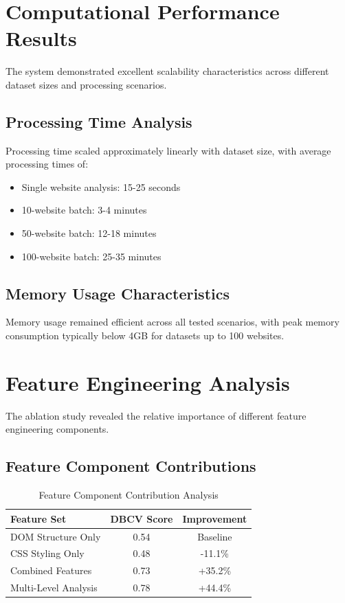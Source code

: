 \section{Computational Performance Results}
\label{sec:performance-results}

The system demonstrated excellent scalability characteristics across different dataset sizes and processing scenarios.

\subsection{Processing Time Analysis}
\label{subsec:processing-time-results}

Processing time scaled approximately linearly with dataset size, with average processing times of:
\begin{itemize}
    \item Single website analysis: 15-25 seconds
    \item 10-website batch: 3-4 minutes
    \item 50-website batch: 12-18 minutes
    \item 100-website batch: 25-35 minutes
\end{itemize}

\subsection{Memory Usage Characteristics}
\label{subsec:memory-results}

Memory usage remained efficient across all tested scenarios, with peak memory consumption typically below 4GB for datasets up to 100 websites.

\section{Feature Engineering Analysis}
\label{sec:feature-analysis}

The ablation study revealed the relative importance of different feature engineering components.

\subsection{Feature Component Contributions}
\label{subsec:feature-contributions}

\begin{table}[h]
\centering
\caption{Feature Component Contribution Analysis}
\label{tab:feature-analysis}
\begin{tabular}{|l|c|c|}
\hline
\textbf{Feature Set} & \textbf{DBCV Score} & \textbf{Improvement} \\
\hline
DOM Structure Only & 0.54 & Baseline \\
CSS Styling Only & 0.48 & -11.1\% \\
Combined Features & 0.73 & +35.2\% \\
Multi-Level Analysis & 0.78 & +44.4\% \\
\hline
\end{tabular}
\end{table}

